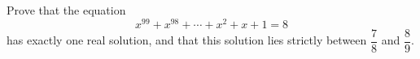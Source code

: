 Prove that the equation
\[
x^{99}+x^{98}+\cdots+x^2+x+1=8
\]
has exactly one real solution, and that this solution lies strictly between $\dfrac{7}{8}$ and $\dfrac{8}{9}$.
